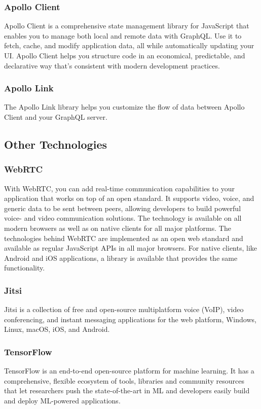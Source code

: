     \subsubsection{Apollo Client}
    Apollo Client is a comprehensive state management library for JavaScript that enables you to manage both local and remote data with GraphQL.
    Use it to fetch, cache, and modify application data, all while automatically updating your UI.
    Apollo Client helps you structure code in an economical, predictable, and declarative way that's consistent with modern development practices. 

    \subsubsection{Apollo Link}
    The Apollo Link library helps you customize the flow of data between Apollo Client and your GraphQL server.

\subsection{Other Technologies}

    \subsubsection{WebRTC}
    With WebRTC, you can add real-time communication capabilities to your application that works on top of an open standard. 
    It supports video, voice, and generic data to be sent between peers, allowing developers to build powerful voice- and video communication solutions. The technology is available on all modern browsers as well as on native clients for all major platforms. The technologies behind WebRTC are implemented as an open web standard and available as regular JavaScript APIs in all major browsers. For native clients, like Android and iOS applications, a library is available that provides the same functionality.

    \subsubsection{Jitsi}
    Jitsi is a collection of free and open-source multiplatform voice (VoIP), video conferencing, and instant messaging applications for the web platform, 
    Windows, Linux, macOS, iOS, and Android.

    \subsubsection{TensorFlow}
    TensorFlow is an end-to-end open-source platform for machine learning. It has a comprehensive, flexible ecosystem of tools, 
    libraries and community resources that let researchers push the state-of-the-art in ML and developers easily build and deploy ML-powered applications.

